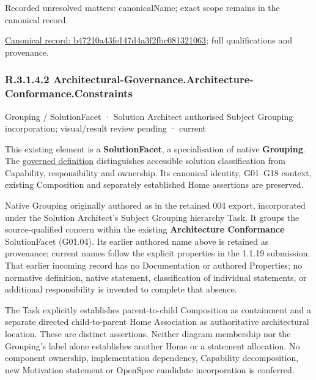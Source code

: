 {\small Recorded unresolved matters: canonicalName; exact scope remains in the canonical record.}\par
{\footnotesize \href{../../../../../../../continuum/grouping/b47210a43fe147d4a3f2fbc081321063.md}{Canonical record: b47210a43fe147d4a3f2fbc081321063}; full qualifications and provenance.}\par
\subsubsection*{R.3.1.4.2 Architectural-Governance.Architecture-Conformance.Constraints}
\label{navigation:R.3.1.4.2}

\label{element:46dd1f4490ae47cc854ce70ff600cb47}
{\small Grouping / SolutionFacet · Solution Architect authorised Subject Grouping incorporation; visual/result review pending · current}\par

This existing element is a \textbf{SolutionFacet}, a specialisation of native
\textbf{Grouping}. The \href{\detokenize{../../../../../../../governance/continuum-representation.md#solutionfacet-classification--1119-candidate}}{governed definition}
distinguishes accessible solution classification from Capability, responsibility
and ownership. Its canonical identity, G01–G18 context, existing Composition
and separately established Home assertions are preserved.



Native Grouping originally authored as \texttt{} in the retained 004 export,
incorporated under the Solution Architect's Subject Grouping hierarchy Task.
It groups the source-qualified \texttt{} concern within
the existing \textbf{Architecture Conformance} SolutionFacet (G01.04). Its earlier authored name above is retained as provenance; current names
follow the explicit properties in the 1.1.19 submission.
That earlier incoming record has no Documentation or authored Properties; no normative
definition, native statement, classification of individual statements, or
additional responsibility is invented to complete that absence.



The Task explicitly establishes parent-to-child Composition as containment and
a separate directed child-to-parent Home Association as authoritative architectural
location. These are distinct assertions. Neither diagram membership nor the
Grouping's label alone establishes another Home or a statement allocation.
No component ownership, implementation dependency, Capability decomposition,
new Motivation statement or OpenSpec candidate incorporation is conferred.



